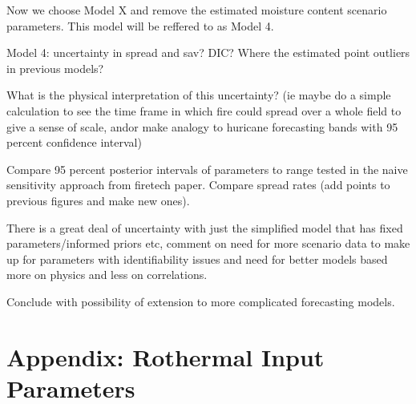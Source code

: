 \documentclass[11pt]{article}
\begin{document}
Now we choose Model X and remove the estimated moisture content scenario parameters. This model will be reffered to as Model 4.

Model 4: uncertainty in spread and sav? DIC? Where the estimated point outliers in previous models?


What is the physical interpretation of this uncertainty? (ie maybe do a simple calculation to see the time frame in which fire could spread over a whole field to give a sense of scale, andor make analogy to huricane forecasting bands with 95 percent confidence interval) 

Compare 95 percent posterior intervals of parameters to range tested in the naive sensitivity approach from firetech paper. Compare spread rates (add points to previous figures and make new ones).

There is a great deal of uncertainty with just the simplified model that has fixed parameters/informed priors etc, comment on need for more scenario data to make up for parameters with identifiability issues and need for better models based more on physics and less on correlations.

Conclude with possibility of extension to more complicated forecasting models.

\clearpage
\appendix
\section{Appendix: Rothermal Input Parameters}
\label{ap:table}
\end{document}
